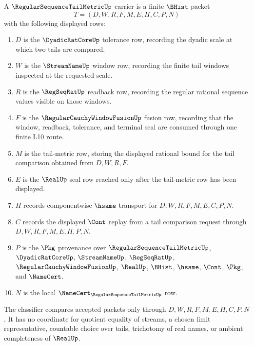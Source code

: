 \begin{definition}\label{def:regular-sequence-tail-metric-carrier}
A $\RegularSequenceTailMetricUp$ carrier is a finite $\BHist$ packet
$$
T=(D,W,R,F,M,E,H,C,P,N)
$$
with the following displayed rows:
\begin{enumerate}
\item $D$ is the $\DyadicRatCoreUp$ tolerance row, recording the dyadic scale at which two tails are compared.
\item $W$ is the $\StreamNameUp$ window row, recording the finite tail windows inspected at the requested scale.
\item $R$ is the $\RegSeqRatUp$ readback row, recording the regular rational sequence values visible on those windows.
\item $F$ is the $\RegularCauchyWindowFusionUp$ fusion row, recording that the window, readback, tolerance, and terminal seal are consumed through one finite L10 route.
\item $M$ is the tail-metric row, storing the displayed rational bound for the tail comparison obtained from $D,W,R,F$.
\item $E$ is the $\RealUp$ seal row reached only after the tail-metric row has been displayed.
\item $H$ records componentwise $\hsame$ transport for $D,W,R,F,M,E,C,P,N$.
\item $C$ records the displayed $\Cont$ replay from a tail comparison request through $D,W,R,F,M,E,H,P,N$.
\item $P$ is the $\Pkg$ provenance over $\RegularSequenceTailMetricUp$, $\DyadicRatCoreUp$, $\StreamNameUp$, $\RegSeqRatUp$, $\RegularCauchyWindowFusionUp$, $\RealUp$, $\BHist$, $\hsame$, $\Cont$, $\Pkg$, and $\NameCert$.
\item $N$ is the local $\NameCert_{\RegularSequenceTailMetricUp}$ row.
\end{enumerate}
The classifier compares accepted packets only through $D,W,R,F,M,E,H,C,P,N$. It has no coordinate for quotient equality of streams, a chosen limit representative, countable choice over tails, trichotomy of real names, or ambient completeness of $\RealUp$.
\end{definition}

